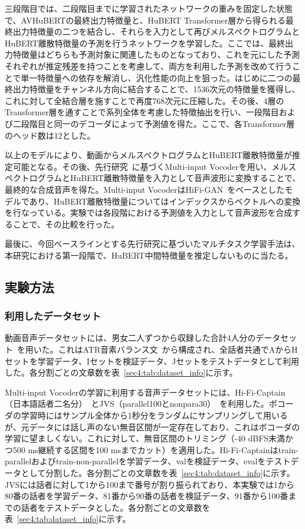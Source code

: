 \documentclass[12pt]{jarticle}
\numberwithin{equation}{section}    %
\numberwithin{figure}{section}      %
\numberwithin{table}{section}      %
\begin{document}
三段階目では、二段階目までに学習されたネットワークの重みを固定した状態で、AVHuBERTの最終出力特徴量と、HuBERT Transformer層から得られる最終出力特徴量の二つを結合し、それらを入力として再びメルスペクトログラムとHuBERT離散特徴量の予測を行うネットワークを学習した。ここでは、最終出力特徴量はどちらも予測対象に関連したものとなっており、これを元にした予測それぞれが推定残差を持つことを考慮して、両方を利用した予測を改めて行うことで単一特徴量への依存を解消し、汎化性能の向上を狙った。はじめに二つの最終出力特徴量をチャンネル方向に結合することで、1536次元の特徴量を獲得し、これに対して全結合層を施すことで再度768次元に圧縮した。その後、4層のTransformer層を通すことで系列全体を考慮した特徴抽出を行い、一段階目および二段階目と同一のデコーダによって予測値を得た。ここで、各Transformer層のヘッド数は12とした。

以上のモデルにより、動画からメルスペクトログラムとHuBERT離散特徴量が推定可能となる。その後、先行研究~\cite{choi2023intelligible}に基づくMulti-input Vocoderを用い、メルスペクトログラムとHuBERT離散特徴量を入力として音声波形に変換することで、最終的な合成音声を得た。Multi-input VocoderはHiFi-GAN~\cite{kong2020hifi}をベースとしたモデルであり、HuBERT離散特徴量についてはインデックスからベクトルへの変換を行なっている。実験では各段階における予測値を入力として音声波形を合成することで、その比較を行った。

最後に、今回ベースラインとする先行研究に基づいたマルチタスク学習手法は、本研究における第一段階で、HuBERT中間特徴量を推定しないものに当たる。

\subsection{実験方法}
\subsubsection{利用したデータセット}
動画音声データセットには、男女二人ずつから収録した合計4人分のデータセット~\cite{taguchi,esaki}を用いた。これはATR音素バランス文~\cite{atr}から構成され、全話者共通でAからHセットを学習データ、Iセットを検証データ、Jセットをテストデータとして利用した。各分割ごとの文章数を表~\ref{sec4:tab:dataset_info}に示す。

Multi-input Vocoderの学習に利用する音声データセットには、Hi-Fi-Captain（日本語話者二名分）~\cite{okamoto2023hi}とJVS（parallel100とnonpara30）~\cite{takamichi2019jvs}を利用した。ボコーダの学習時にはサンプル全体から1秒分をランダムにサンプリングして用いるが、元データには話し声のない無音区間が一定存在しており、これはボコーダの学習に望ましくない。これに対して、無音区間のトリミング（-40 dBFS未満かつ500 ms継続する区間を100 msまでカット）を適用した。Hi-Fi-Captainはtrain-parallelおよびtrain-non-parallelを学習データ、valを検証データ、evalをテストデータとして分割した。各分割ごとの文章数を表~\ref{sec4:tab:dataset_info}に示す。JVSには話者に対して1から100まで番号が割り振られており、本実験では1から80番の話者を学習データ、81番から90番の話者を検証データ、91番から100番までの話者をテストデータとした。各分割ごとの文章数を表~\ref{sec4:tab:dataset_info}に示す。
\end{document}
